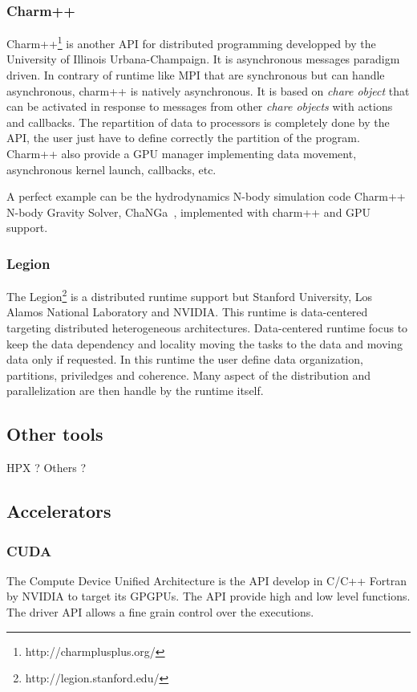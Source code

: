 \subsubsection{Charm++}
Charm++\footnote{http://charmplusplus.org/} is another API for distributed programming developped by the University of Illinois Urbana-Champaign.
It is asynchronous messages paradigm driven.
In contrary of runtime like MPI that are synchronous but can handle asynchronous, charm++ is natively asynchronous. 
It is based on \textit{chare object} that can be activated in response to messages from other \textit{chare objects} with actions and callbacks. 
The repartition of data to processors is completely done by the API, the user just have to define correctly the partition of the program. 
Charm++ also provide a GPU manager implementing data movement, asynchronous kernel launch, callbacks, etc.

A perfect example can be the hydrodynamics N-body simulation code Charm++ N-body Gravity Solver, ChaNGa~\cite{jetley2010scaling}, implemented with charm++ and GPU support. 

\subsubsection{Legion}
The Legion\footnote{http://legion.stanford.edu/} is a distributed runtime support but Stanford University, Los Alamos National Laboratory and NVIDIA. 
This runtime is data-centered targeting distributed heterogeneous architectures. 
Data-centered runtime focus to keep the data dependency and locality moving the tasks to the data and moving data only if requested. 
In this runtime the user define data organization, partitions, priviledges and coherence. 
Many aspect of the distribution and parallelization are then handle by the runtime itself.

\subsection{Other tools}
HPX ? 
Others ? 

\subsection{Accelerators}
\subsubsection{CUDA}
The Compute Device Unified Architecture is the API develop in C/C++ Fortran by NVIDIA to target its GPGPUs. 
The API provide high and low level functions. 
The driver API allows a fine grain control over the executions.

